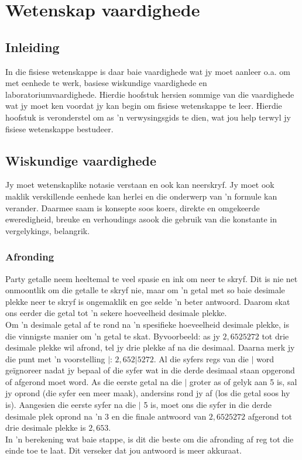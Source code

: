          \chapter{Wetenskap vaardighede}
    \setcounter{figure}{1}\setcounter{subfigure}{1}\label{m30853}
    \section{Inleiding}
            \nopagebreak
In die fisiese wetenskappe is daar baie vaardighede wat jy moet aanleer o.a. om met eenhede te werk, basiese wiskundige vaardighede en laboratoriumvaardighede. Hierdie hoofstuk hersien sommige van die vaardighede wat jy moet ken voordat jy kan begin om fisiese wetenskappe te leer. Hierdie hoofstuk is veronderstel om as  'n verwysingsgids te dien, wat jou help terwyl jy fisiese wetenskappe bestudeer. 
\section{Wiskundige vaardighede}
Jy moet wetenskaplike notasie verstaan en ook kan neerskryf. Jy moet ook maklik verskillende eenhede kan herlei en die onderwerp van  'n formule kan verander. Daarmee saam is konsepte soos koers, direkte en omgekeerde eweredigheid, breuke en verhoudings asook die gebruik van die konstante in vergelykings, belangrik.  
\subsection*{Afronding}
Party getalle neem heeltemal te veel spasie en ink om neer te skryf. Dit is nie net onmoontlik om die getalle te skryf nie, maar om  'n getal met so baie desimale plekke neer te skryf is ongemaklik en gee selde  'n beter antwoord. Daarom skat ons eerder die getal tot  'n sekere hoeveelheid desimale plekke. \\
Om  'n desimale getal af te rond na  'n spesifieke hoeveelheid desimale plekke, is die vinnigste manier om  'n getal te skat. Byvoorbeeld: as jy $2,6525272$ tot drie desimale plekke wil afrond, tel jy drie plekke af na die desimaal. Daarna merk jy die punt met  'n voorstelling $|$: $2,652|5272$. Al die syfers regs van die $|$ word geïgnoreer nadat jy bepaal of die syfer wat in die derde desimaal staan opgerond of afgerond moet word. As die eerste getal na die $|$ groter as of gelyk aan 5 is, sal jy oprond (die syfer een meer maak), andersins rond jy af (los die getal soos hy is). Aangesien die eerste syfer na die $|$ 5 is, moet ons die syfer in die derde desimale plek oprond na  'n 3 en die finale antwoord van $2,6525272$ afgerond tot drie desimale plekke is $2,653$. \\
In 'n berekening wat baie stappe, is dit die beste om die afronding af reg tot die einde toe te laat. Dit verseker dat jou antwoord is meer akkuraat.

